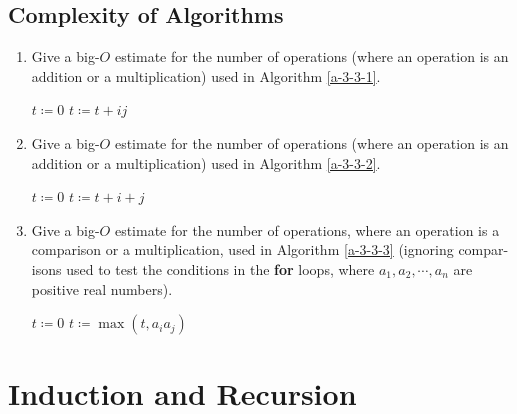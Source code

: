 \documentclass{../../cls/sig-alternate-05-2015}
\begin{document}
\subsection{Complexity of Algorithms}
\begin{enumerate}
\item Give a big-$O$ estimate for the number of operations (where an operation is an addition or a multiplication) used in Algorithm \ref{a-3-3-1}. \begin{algorithm}[H]
	\caption{}
	\label{a-3-3-1}
	\begin{algorithmic}
		\State $t \coloneqq 0$
		\State $t \coloneqq t + ij$
		\EndFor
		\EndFor
	\end{algorithmic}
\end{algorithm}

\item Give a big-$O$ estimate for the number of operations (where an operation is an addition or a multiplication) used in Algorithm \ref{a-3-3-2}. \begin{algorithm}[H]
	\caption{}
	\label{a-3-3-2}
	\begin{algorithmic}
		\State $t \coloneqq 0$
		\For{$i \coloneqq 1, 2, \cdots, n$}
		\For{$j \coloneqq 1, 2, \cdots, n$}
		\State $t \coloneqq t + i + j$
		\EndFor
		\EndFor
	\end{algorithmic}
\end{algorithm}

\item Give a big-$O$ estimate for the number of operations, where an operation is a comparison or a multiplication, used in Algorithm \ref{a-3-3-3} (ignoring compar- isons used to test the conditions in the \textbf{for} loops, where $a_1, a_2, \cdots, a_n$ are positive real numbers). \begin{algorithm}[H]
	\caption{}
	\label{a-3-3-3}
	\begin{algorithmic}
		\State $t \coloneqq 0$
		\For{$j \coloneqq i + 1, i + 2, \cdots, n$}
		\State $t \coloneqq \max(t, a_i a_j)$
		\EndFor
		\EndFor
	\end{algorithmic}
\end{algorithm}

\end{enumerate}

\section{Induction and Recursion}
\end{document}
